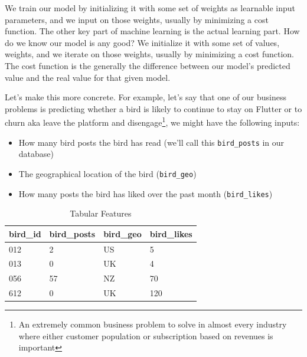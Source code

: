 \documentclass[draft, 11pt]{diazessay} %
\begin{document}
We train our model by initializing it with some set of weights as learnable input parameters, and we input on those weights, usually by minimizing a cost function. The other key part of machine learning is the actual learning part. How do we know our model is any good? We initialize it with some set of values, weights, and we iterate on those weights, usually by minimizing a cost function. The cost function is the generally the difference between our model's predicted value and the real value for that given model.

Let's make this more concrete. For example, let's say that one of our business problems is predicting whether a bird is likely to continue to stay on Flutter or to churn aka leave the platform and disengage\footnote{An extremely common business problem to solve in almost every industry where either customer population or subscription based on revenues is important}, we might have the following inputs: 

\begin{itemize}
  \item How many bird posts the bird has read (we'll call this \texttt{bird_posts} in our database)
  \item The geographical location of the bird (\texttt{bird_geo})
  \item How many posts the bird has liked over the past month (\texttt{bird_likes})
\end{itemize}

\begin{table}[H]
  \centering
    \caption{Tabular Features}
\begin{tabular}{|l|l|l|l|}
\hline
\rowcolor[HTML]{EFEFEF} 
bird\_id & bird\_posts & bird\_geo & bird\_likes \\ \hline
012      & 2           & US        & 5           \\ \hline
013      & 0           & UK        & 4           \\ \hline
056      & 57          & NZ        & 70          \\ \hline
612      & 0           & UK        & 120         \\ \hline
\end{tabular}
\end{table}
\end{document}
